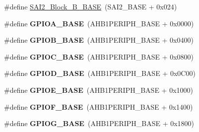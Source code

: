 \begin{DoxyCompactItemize}
\item 
\#define \hyperlink{group___peripheral__memory__map_ga034a6ac8f61e4d15cd9f2f7eca140569}{S\+A\+I2\+\_\+\+Block\+\_\+\+B\+\_\+\+B\+A\+SE}~(S\+A\+I2\+\_\+\+B\+A\+SE + 0x024)
\item 
\#define {\bfseries G\+P\+I\+O\+A\+\_\+\+B\+A\+SE}~(A\+H\+B1\+P\+E\+R\+I\+P\+H\+\_\+\+B\+A\+SE + 0x0000)\hypertarget{group___peripheral__memory__map_gad7723846cc5db8e43a44d78cf21f6efa}{}\label{group___peripheral__memory__map_gad7723846cc5db8e43a44d78cf21f6efa}

\item 
\#define {\bfseries G\+P\+I\+O\+B\+\_\+\+B\+A\+SE}~(A\+H\+B1\+P\+E\+R\+I\+P\+H\+\_\+\+B\+A\+SE + 0x0400)\hypertarget{group___peripheral__memory__map_gac944a89eb789000ece920c0f89cb6a68}{}\label{group___peripheral__memory__map_gac944a89eb789000ece920c0f89cb6a68}

\item 
\#define {\bfseries G\+P\+I\+O\+C\+\_\+\+B\+A\+SE}~(A\+H\+B1\+P\+E\+R\+I\+P\+H\+\_\+\+B\+A\+SE + 0x0800)\hypertarget{group___peripheral__memory__map_ga26f267dc35338eef219544c51f1e6b3f}{}\label{group___peripheral__memory__map_ga26f267dc35338eef219544c51f1e6b3f}

\item 
\#define {\bfseries G\+P\+I\+O\+D\+\_\+\+B\+A\+SE}~(A\+H\+B1\+P\+E\+R\+I\+P\+H\+\_\+\+B\+A\+SE + 0x0\+C00)\hypertarget{group___peripheral__memory__map_ga1a93ab27129f04064089616910c296ec}{}\label{group___peripheral__memory__map_ga1a93ab27129f04064089616910c296ec}

\item 
\#define {\bfseries G\+P\+I\+O\+E\+\_\+\+B\+A\+SE}~(A\+H\+B1\+P\+E\+R\+I\+P\+H\+\_\+\+B\+A\+SE + 0x1000)\hypertarget{group___peripheral__memory__map_gab487b1983d936c4fee3e9e88b95aad9d}{}\label{group___peripheral__memory__map_gab487b1983d936c4fee3e9e88b95aad9d}

\item 
\#define {\bfseries G\+P\+I\+O\+F\+\_\+\+B\+A\+SE}~(A\+H\+B1\+P\+E\+R\+I\+P\+H\+\_\+\+B\+A\+SE + 0x1400)\hypertarget{group___peripheral__memory__map_ga7f9a3f4223a1a784af464a114978d26e}{}\label{group___peripheral__memory__map_ga7f9a3f4223a1a784af464a114978d26e}

\item 
\#define {\bfseries G\+P\+I\+O\+G\+\_\+\+B\+A\+SE}~(A\+H\+B1\+P\+E\+R\+I\+P\+H\+\_\+\+B\+A\+SE + 0x1800)\hypertarget{group___peripheral__memory__map_ga5d8ca4020f2e8c00bde974e8e7c13cfe}{}\label{group___peripheral__memory__map_ga5d8ca4020f2e8c00bde974e8e7c13cfe}


\end{DoxyCompactItemize}
